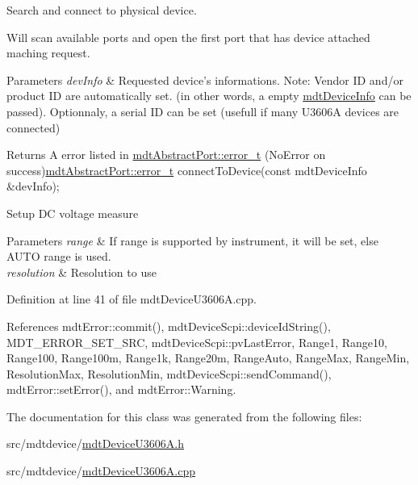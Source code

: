Search and connect to physical device. 

Will scan available ports and open the first port that has device attached maching request.


\begin{DoxyParams}{Parameters}
{\em dev\-Info} & Requested device's informations. Note\-: Vendor I\-D and/or product I\-D are automatically set. (in other words, a empty \hyperlink{classmdt_device_info}{mdt\-Device\-Info} can be passed). Optionnaly, a serial I\-D can be set (usefull if many U3606\-A devices are connected) \\
\hline
\end{DoxyParams}
\begin{DoxyReturn}{Returns}
A error listed in \hyperlink{classmdt_abstract_port_ad4121bb930c95887e77f8bafa065a85e}{mdt\-Abstract\-Port\-::error\-\_\-t} (No\-Error on success)\hyperlink{classmdt_abstract_port_ad4121bb930c95887e77f8bafa065a85e}{mdt\-Abstract\-Port\-::error\-\_\-t} connect\-To\-Device(const mdt\-Device\-Info \&dev\-Info);
\end{DoxyReturn}
Setup D\-C voltage measure


\begin{DoxyParams}{Parameters}
{\em range} & If range is supported by instrument, it will be set, else A\-U\-T\-O range is used. \\
\hline
{\em resolution} & Resolution to use \\
\hline
\end{DoxyParams}


Definition at line 41 of file mdt\-Device\-U3606\-A.\-cpp.



References mdt\-Error\-::commit(), mdt\-Device\-Scpi\-::device\-Id\-String(), M\-D\-T\-\_\-\-E\-R\-R\-O\-R\-\_\-\-S\-E\-T\-\_\-\-S\-R\-C, mdt\-Device\-Scpi\-::pv\-Last\-Error, Range1, Range10, Range100, Range100m, Range1k, Range20m, Range\-Auto, Range\-Max, Range\-Min, Resolution\-Max, Resolution\-Min, mdt\-Device\-Scpi\-::send\-Command(), mdt\-Error\-::set\-Error(), and mdt\-Error\-::\-Warning.



The documentation for this class was generated from the following files\-:\begin{DoxyCompactItemize}
\item 
src/mdtdevice/\hyperlink{mdt_device_u3606_a_8h}{mdt\-Device\-U3606\-A.\-h}\item 
src/mdtdevice/\hyperlink{mdt_device_u3606_a_8cpp}{mdt\-Device\-U3606\-A.\-cpp}\end{DoxyCompactItemize}
